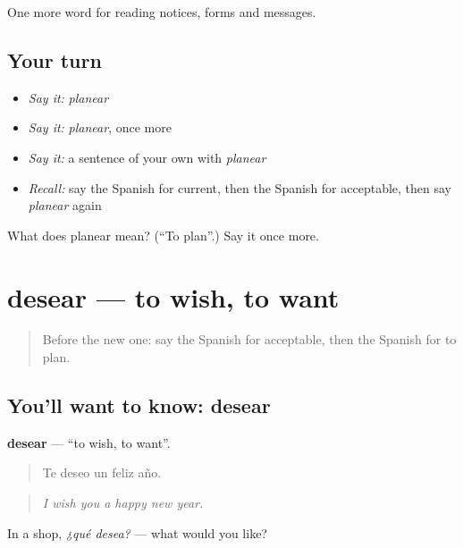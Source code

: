\begin{grammarlens}[title={What you've built}]
One more word for reading notices, forms and messages.
\end{grammarlens}

\subsection*{Your turn}
\begin{itemize}
\raggedright
  \item \emph{Say it:} \emph{planear}
  \item \emph{Say it:} \emph{planear}, once more
  \item \emph{Say it:} a sentence of your own with \emph{planear}
  \item \emph{Recall:} say the Spanish for current, then the Spanish for acceptable, then say \emph{planear} again
\end{itemize}

\begin{tcolorbox}[breakable,colback=teal!4,colframe=teal!35!black,title={Before you move on}]
What does planear mean? (\textquotedblleft{}To plan\textquotedblright{}.) Say it once more.
\end{tcolorbox}
\section[desear]{desear — to wish, to want}

\label{lesson:ES-C509-desear}



\begin{quote}
Before the new one: say the Spanish for acceptable, then the Spanish for to plan.
\end{quote}

\subsection*{You'll want to know: desear}
\textbf{desear} — \textquotedblleft{}to wish, to want\textquotedblright{}.

\begin{quote}
Te deseo un feliz año.
\end{quote}

\begin{quote}
\emph{I wish you a happy new year.}
\end{quote}

In a shop, \emph{¿qué desea?} — what would you like?

